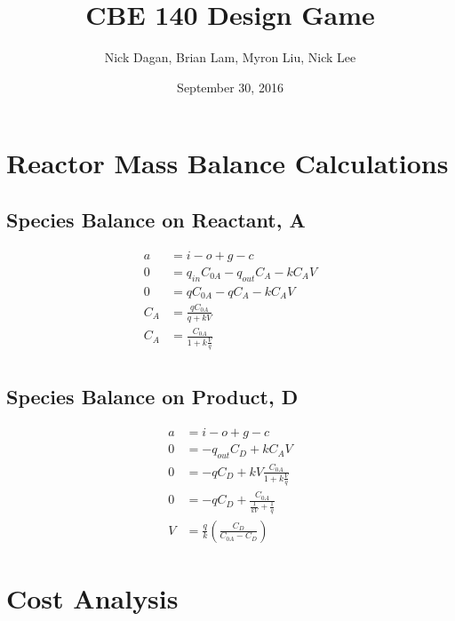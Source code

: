 \documentclass[letterpaper, 12pt]{article}
\title{CBE 140 Design Game}
\author{Nick Dagan, Brian Lam, Myron Liu, Nick Lee}
\date{September 30, 2016}
\begin{document}
\maketitle
\vspace{-20pt}

\section{Reactor Mass Balance Calculations}
\subsection{Species Balance on Reactant, A}
\begin{align*}
	a &= i - o + g - c \\
	0 &= q_{in}C_{0A} - q_{out}C_A - k C_A V \\
	0 &= qC_{0A} - qC_A - k C_A V \\
	C_A &= \frac{qC_{0A}}{q + kV} \\
	C_A &= \frac{C_{0A}}{1+k\frac{V}{q}} \\
\end{align*}

\subsection{Species Balance on Product, D}
\begin{align*}
	a &= i - o + g - c \\
	0 &= -q_{out}C_D + k C_A V \\
	0 &= -qC_D + kV\frac{C_{0A}}{1+k\frac{V}{q}} \\
	0 &= -qC_D + \frac{C_{0A}}{\frac{1}{kV}+\frac{1}{q}} \\
	V &= \frac{q}{k}\left( \frac{C_D}{C_{0A} - C_D} \right)
\end{align*}

\section{Cost Analysis}
\end{document}
